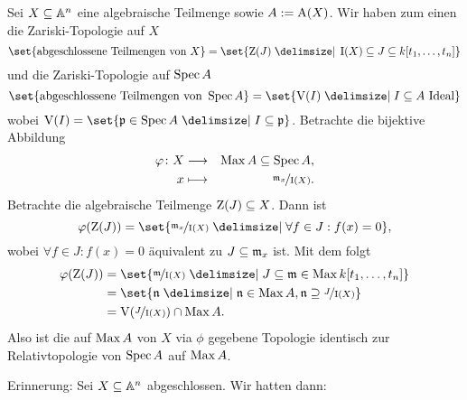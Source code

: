 \documentclass[12pt,a4paper]{scrartcl}
\theoremstyle{cplain}
\theoremstyle{cdef}
\begin{document}
\begin{bem}
	Sei $X\subseteq \mathbb A^n$ eine algebraische Teilmenge sowie $A := \operatorname{A}(X)$. Wir haben zum einen die Zariski-Topologie auf $X$
	\[\set{\text{abgeschlossene Teilmengen von } X} = \set{\Z(J)\given \I(X) \subseteq J\subseteq k[t_1,\dots, t_n]}\]
	und die Zariski-Topologie auf $\operatorname{Spec} A$
	\[\set{\text{abgeschlossene Teilmengen von }\Spec A} = \set{\V(I)\given I\subseteq A \text{ Ideal}}\]
	wobei $\V(I) = \set{\fp\in \Spec A\given I\subseteq \fp}$.
	Betrachte die bijektive Abbildung
	\begin{eqnarray*}
		\varphi\colon X & \longrightarrow &\operatorname{Max} A \subseteq \operatorname{Spec} A,\\
		x & \longmapsto & \nicefrac{\mathfrak{m}_x}{\operatorname{I}(X)}.
	\end{eqnarray*}
	Betrachte die algebraische Teilmenge $\operatorname{Z}(J)\subseteq X$. Dann ist \[\phi(\Z(J)) = \set{\fak{\fm_x}{\I(X)}\given \forall f\in J: f(x) = 0},\]
	wobei $\forall f\in J: f(x) = 0$ äquivalent zu $J\subseteq \mathfrak{m}_x$ ist. Mit dem  folgt
	\begin{align*}
		\phi(\Z(J)) &= \set{\fak{\fm}{\I(X)}\given J\subseteq \fm\in\Max k[t_1,\dots, t_n]}\\
		&= \set{ \fn \given \fn\in \Max A, \fn\supseteq \fak J{\I(X)}}\\
		&= \V(\fak J{\I(X)})\cap \Max A.
	\end{align*}
	Also ist die auf $\operatorname{Max} A$ von $X$ via $\phi$ gegebene Topologie identisch zur Relativtopologie von $\operatorname{Spec} A$ auf $\operatorname{Max} A$.
\end{bem}

Erinnerung: Sei $X\subseteq \mathbb A^n$ abgeschlossen. Wir hatten dann: 
	\begin{center}
	\end{center} 
\end{document}

